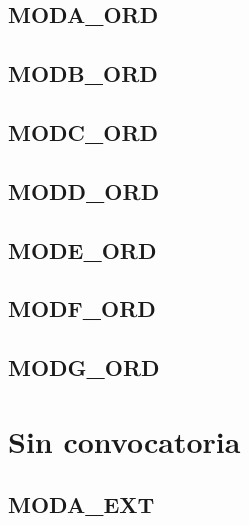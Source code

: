\documentclass{unirExamen}
\begin{document}




\subsection{MODA\_ORD}

\subsection{MODB\_ORD}

\subsection{MODC\_ORD}

\subsection{MODD\_ORD}

\subsection{MODE\_ORD}

\subsection{MODF\_ORD}

\subsection{MODG\_ORD}

\section{Sin convocatoria}
\subsection{MODA\_EXT}

\end{document}
